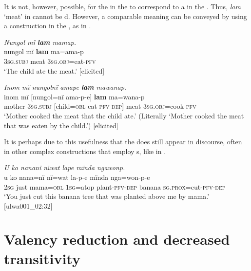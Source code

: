 It is not, however, possible, for the  in the  to correspond to a  in the . Thus, \textit{lam} ‘meat’ in  cannot be d. However, a comparable meaning can be conveyed by using a  construction in the , as in .

\ea%
    \label{ex:syntax:291}
          \textit{Nungol mï \textbf{lam} mamap.}\\
\gll    nungol  mï      \textbf{lam}  ma=ama-p\\
    [name]  3\textsc{sg.subj}  meat  \textsc{3sg.obj}=eat-\textsc{pfv}\\
\glt `The child ate the meat.’ [elicited]
\z

\ea%
    \label{ex:syntax:292}
          \textit{Inom mï nungolnï amape \textbf{lam} mawanap.}\\
\gll    inom  mï      [nungol=nï  ama-p-e]    \textbf{lam}     ma=wana-p\\
    mother  \textsc{3sg.subj}  [child=\textsc{obl}  eat-\textsc{pfv-dep]}  meat    \textsc{3sg.obj}=cook-\textsc{pfv}\\
\glt `Mother cooked the meat that the child ate.’ (Literally ‘Mother cooked the meat that was eaten by the child.’) [elicited]
\z

It is perhaps due to this usefulness that the   does still appear in discourse, often in other complex constructions that employ s, like in .


\ea%
    \label{ex:syntax:293}
          \textit{U ko nananï nïwat lape mïnda ngawonp.}\\
\gll    u    ko  nana=nï    nï=wat    la-p-e      mïnda nga=won-p-e\\
    2\textsc{sg}  just  mama=\textsc{obl}  1\textsc{sg=}atop  plant-\textsc{pfv-dep}  banana    \textsc{sg.prox}=cut-\textsc{pfv-dep}\\
\glt `You just cut this banana tree that was planted above me by mama.’ [ulwa001\_02:32]
\z

\section{Valency reduction and decreased transitivity}\label{sec:13.8}


